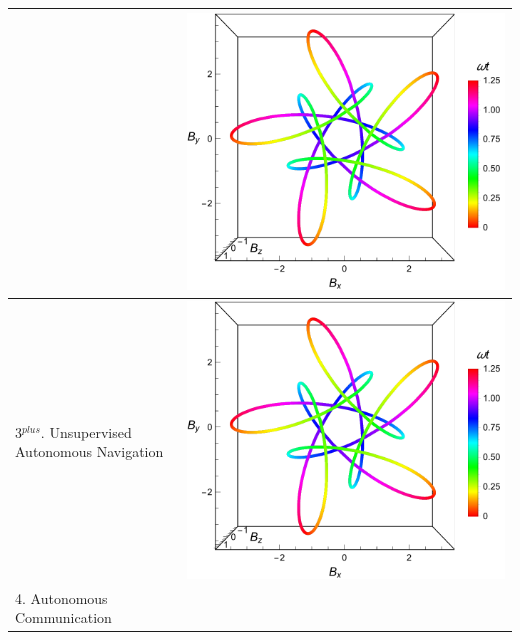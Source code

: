 \begin{table}[h!]
\begin{tabular}{ | m{6cm} | m{6cm} | }
      &
      \begin{minipage}{.15\textwidth}
      \includegraphics[width=\linewidth]{figures/5_1.pdf}
    \end{minipage}
    \\  \hline
      3$^{plus}$. Unsupervised Autonomous Navigation 
   
      
      &
      \begin{minipage}{.15\textwidth}
      \includegraphics[width=\linewidth]{figures/5_1.pdf}
    \end{minipage}
    \\ \hline
      4. Autonomous Communication
    

\end{tabular}
\end{table}
